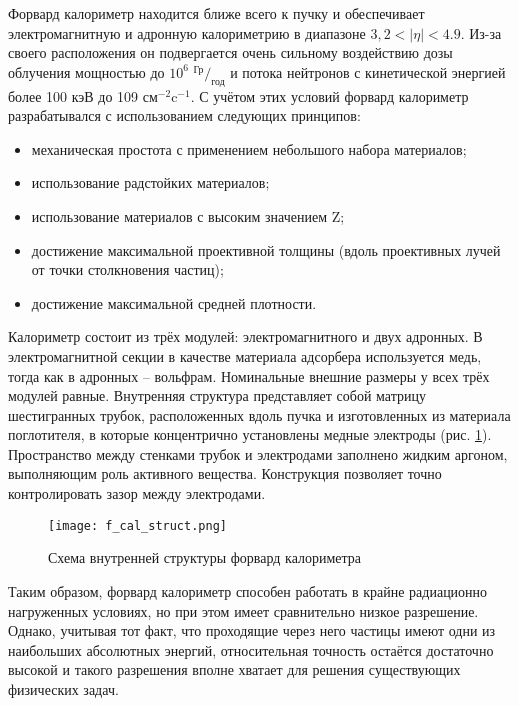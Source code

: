 Форвард калориметр находится ближе всего к пучку и обеспечивает электромагнитную и адронную калориметрию в диапазоне $3,2 < |\eta| < 4.9$. Из-за своего расположения он подвергается очень сильному воздействию дозы облучения мощностью до $10^6$ ${^\text{Гр}} / _\text{год}$ и потока нейтронов с кинетической энергией более 100 кэВ до 109 $\text{см}^{-2}\text{c}^{-1}$\parencite{tdr_old}. С учётом этих условий форвард калориметр разрабатывался с использованием следующих принципов:
\begin{itemize}
    \item механическая простота с применением небольшого набора материалов;
    \item использование радстойких материалов;
    \item использование материалов с высоким значением Z;
    \item достижение максимальной проективной толщины (вдоль проективных лучей от точки столкновения частиц);
    \item достижение максимальной средней плотности.
\end{itemize}\par
Калориметр состоит из трёх модулей: электромагнитного и двух адронных. В электромагнитной секции в качестве материала адсорбера используется медь, тогда как в адронных -- вольфрам. Номинальные внешние размеры у всех трёх модулей равные. Внутренняя структура представляет собой матрицу шестигранных трубок, расположенных вдоль пучка и изготовленных из материала поглотителя, в которые концентрично установлены медные электроды (рис. \ref{fig:f_cal_struct}). Пространство между стенками трубок и электродами заполнено жидким аргоном, выполняющим роль активного вещества. Конструкция позволяет точно контролировать зазор между электродами.
\begin{figure}[ht]
    \centering
    \texttt{[image: f\_cal\_struct.png]}
    \caption{Схема внутренней структуры форвард калориметра\parencite{tdr_old}}
    \label{fig:f_cal_struct}
\end{figure}\par
Таким образом, форвард калориметр способен работать в крайне радиационно нагруженных условиях, но при этом имеет сравнительно низкое разрешение. Однако, учитывая тот факт, что проходящие через него частицы имеют одни из наибольших абсолютных энергий, относительная точность остаётся достаточно высокой и такого разрешения вполне хватает для решения существующих физических задач.
